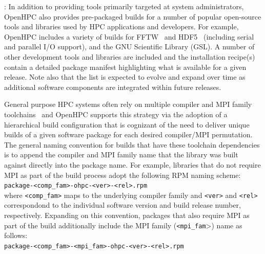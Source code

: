 \documentclass{sig-alternate-05-2015}
\begin{document}
: In addition to providing tools primarily
targeted at system administrators, OpenHPC also provides pre-packaged builds
for a number of popular open-source tools and libraries used by HPC
applications and developers. For example, OpenHPC includes a variety of builds
for FFTW~\cite{fftw_url} and HDF5~\cite{hdf5_url} (including serial and
parallel I/O support), and the GNU Scientific Library (GSL). A number of other
development tools and libraries are included and the installation recipe(s)
contain a detailed package manifest highlighting what is available for a given
release. Note also that the list is expected to evolve
and expand over time as additional software components are integrated within
future releases.

General purpose HPC systems often rely on multiple compiler and MPI family
toolchains~\cite{tacc_sc_best_practices:2011} and OpenHPC supports this
strategy via the adoption of a hierarchical build configuration that is
cognizant of the need to deliver unique builds of a given software package for
each desired compiler/MPI permutation.
The general naming convention for builds that have these toolchain dependencies 
is to append the compiler and MPI family name that the
library was built against directly into the package name. For example,
libraries that do not require MPI as part of the build process adopt the
following RPM naming scheme: \\

\noindent
\texttt{package-<comp\_fam>-ohpc-<ver>-<rel>.rpm} \\

\noindent where \texttt{<comp\_fam>} maps to the underlying compiler family and \texttt{<ver>}
and \texttt{<rel>} correspondond to the individual software version and build
release number, respectively.
Expanding on this convention, packages that also require MPI as part of the build 
additionally include the MPI family (\texttt{<mpi\_fam}>) name as follows: \\

\noindent
\texttt{package-<comp\_fam>-<mpi\_fam>-ohpc-<ver>-<rel>.rpm} \\
\end{document}
